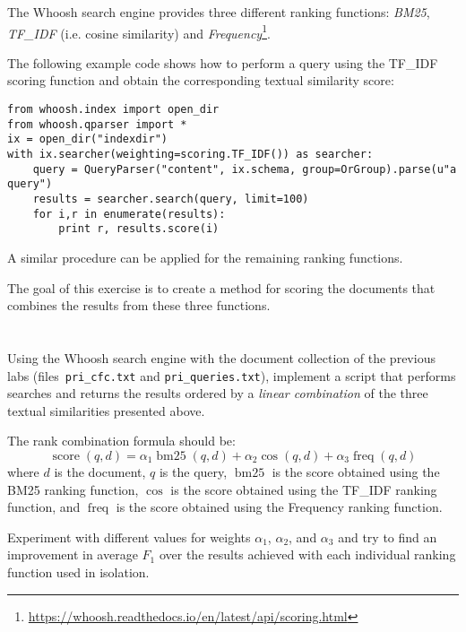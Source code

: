 \documentclass[12pt]{article}
\begin{document}

The Whoosh search engine provides three different ranking functions: \emph{BM25}, \emph{TF\_IDF} (i.e. cosine similarity) and \emph{Frequency}\footnote{\url{https://whoosh.readthedocs.io/en/latest/api/scoring.html}}. 

The following example code shows how to perform a query using the
TF\_IDF scoring function and obtain the corresponding textual similarity score:
\begin{verbatim}
from whoosh.index import open_dir
from whoosh.qparser import *
ix = open_dir("indexdir")
with ix.searcher(weighting=scoring.TF_IDF()) as searcher:
    query = QueryParser("content", ix.schema, group=OrGroup).parse(u"a query")
    results = searcher.search(query, limit=100)
    for i,r in enumerate(results):
        print r, results.score(i)
\end{verbatim}
A similar procedure can be applied for the remaining ranking functions.

The goal of this exercise is to create a method for scoring the documents that combines the results from these three functions.

\section{}

Using the Whoosh search engine with the document collection of the previous labs (files~\texttt{pri\_cfc.txt} and \texttt{pri\_queries.txt}), implement a script that performs searches and returns the results ordered by a \emph{linear combination} of the three textual similarities presented above.

The rank combination formula should be:
\begin{displaymath}
    \operatorname{score}(q,d) = \alpha_1\operatorname{bm25}(q,d) + \alpha_2\operatorname{cos}(q,d) + \alpha_3\operatorname{freq}(q,d)
\end{displaymath}
where $d$ is the document, $q$ is the query, $\operatorname{bm25}$ is the score obtained using the BM25 ranking function, $\operatorname{cos}$ is the score obtained using the TF\_IDF ranking function, and $\operatorname{freq}$ is the score obtained using the Frequency ranking function.

Experiment with different values for weights $\alpha_1$, $\alpha_2$, and $\alpha_3$ and try to find an improvement in average $F_1$ over the results achieved with each individual ranking function used in isolation.
\end{document}
